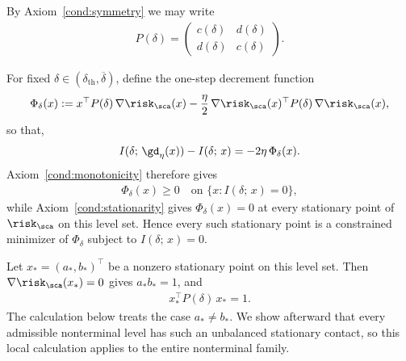 \documentclass{article}
\begin{document}
By Axiom~\ref{cond:symmetry} we may write
\begin{align}
    P(\delta)
    =
    \begin{pmatrix}
        c(\delta) & d(\delta) \\
        d(\delta) & c(\delta)
    \end{pmatrix}.
\end{align}


For fixed $\delta \in (\delta_{\mathrm{th}}, \overline\delta)$, define the
one-step decrement function
\begin{align}
    \Phi_\delta(x)
    :=
    x^\top P(\delta)\, \nabla \risk_\sca(x)
    - \frac{\eta}{2}\,
      \nabla \risk_\sca(x)^\top P(\delta)\, \nabla \risk_\sca(x),
\end{align}
so that, 
\begin{align}
    I(\delta;\, \gd_\eta(x)) - I(\delta;\, x) = -2\eta\, \Phi_\delta(x).
\end{align}
Axiom~\ref{cond:monotonicity} therefore gives
\begin{align}
    \Phi_\delta(x) \ge 0
    \quad
    \text{on } \{x : I(\delta;\, x) = 0\},
\end{align}
while Axiom~\ref{cond:stationarity} gives $\Phi_\delta(x) = 0$ at every
stationary point of $\risk_\sca$ on this level set. Hence every such
stationary point is a constrained minimizer of $\Phi_\delta$ subject to
$I(\delta;\, x) = 0$.

Let $x_*=(a_*,b_*)^\top$ be a nonzero stationary point on this level set.
Then $\nabla \risk_\sca(x_*)=0$ gives $a_*b_*=1$, and
\begin{align}
    x_*^\top P(\delta)\,x_* = 1.
    \label{eq:appendix_normalization_constraint}
\end{align}
The calculation below treats the case $a_*\ne b_*$. We show afterward that
every admissible nonterminal level has such an unbalanced stationary contact,
so this local calculation applies to the entire nonterminal family.
\end{document}
